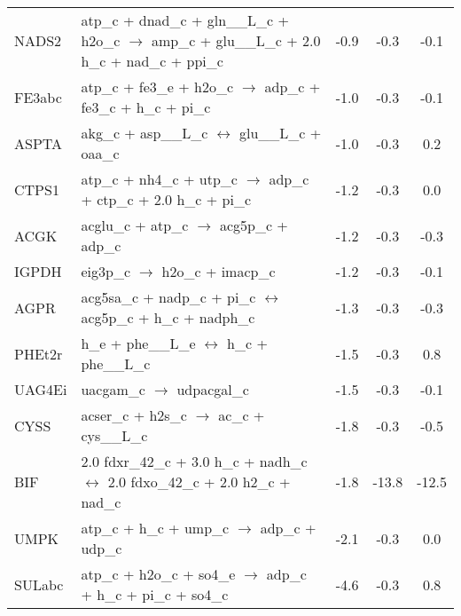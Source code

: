 \begin{supertabular}{lp{0.5\textwidth}ccc}
NADS2	&	atp\_c + dnad\_c + gln\_\_L\_c + h2o\_c $\rightarrow$ amp\_c + glu\_\_L\_c + 2.0 h\_c + nad\_c + ppi\_c	&	-0.9	&	-0.3	&	-0.1	\\
FE3abc	&	atp\_c + fe3\_e + h2o\_c $\rightarrow$ adp\_c + fe3\_c + h\_c + pi\_c	&	-1.0	&	-0.3	&	-0.1	\\
ASPTA	&	akg\_c + asp\_\_L\_c $\leftrightarrow$ glu\_\_L\_c + oaa\_c	&	-1.0	&	-0.3	&	0.2	\\
CTPS1	&	atp\_c + nh4\_c + utp\_c $\rightarrow$ adp\_c + ctp\_c + 2.0 h\_c + pi\_c	&	-1.2	&	-0.3	&	0.0	\\
ACGK	&	acglu\_c + atp\_c $\rightarrow$ acg5p\_c + adp\_c	&	-1.2	&	-0.3	&	-0.3	\\
IGPDH	&	eig3p\_c $\rightarrow$ h2o\_c + imacp\_c	&	-1.2	&	-0.3	&	-0.1	\\
AGPR	&	acg5sa\_c + nadp\_c + pi\_c $\leftrightarrow$ acg5p\_c + h\_c + nadph\_c	&	-1.3	&	-0.3	&	-0.3	\\
PHEt2r	&	h\_e + phe\_\_L\_e $\leftrightarrow$ h\_c + phe\_\_L\_c	&	-1.5	&	-0.3	&	0.8	\\
UAG4Ei	&	uacgam\_c $\rightarrow$ udpacgal\_c	&	-1.5	&	-0.3	&	-0.1	\\
CYSS	&	acser\_c + h2s\_c $\rightarrow$ ac\_c + cys\_\_L\_c	&	-1.8	&	-0.3	&	-0.5	\\
BIF	&	2.0 fdxr\_42\_c + 3.0 h\_c + nadh\_c $\leftrightarrow$ 2.0 fdxo\_42\_c + 2.0 h2\_c + nad\_c	&	-1.8	&	-13.8	&	-12.5	\\
UMPK	&	atp\_c + h\_c + ump\_c $\rightarrow$ adp\_c + udp\_c	&	-2.1	&	-0.3	&	0.0	\\
SULabc	&	atp\_c + h2o\_c + so4\_e $\rightarrow$ adp\_c + h\_c + pi\_c + so4\_c	&	-4.6	&	-0.3	&	0.8	\\
\end{supertabular}
